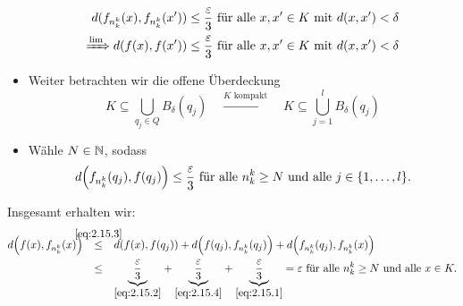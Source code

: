 \begin{beweis}
\begin{itemize}
		\begin{align}
			d(f_{n_k^k}(x),f_{n_k^k}(x')) &\leq \frac{\varepsilon}{3} \text{ für alle } x,x' \in K \text{ mit } d(x,x') < \delta \label{eq:2.15.1} \\
			\xRightarrow{\lim} d(f(x),f(x')) &\leq \frac{\varepsilon}{3} \text{ für alle } x,x' \in K \text{ mit } d(x,x') < \delta \label{eq:2.15.2}
		\end{align}
		\item Weiter betrachten wir die offene Überdeckung
		\begin{equation}
			K \subseteq \bigcup_{q_j \in Q} B_\delta (q_j) \quad \xrightarrow{K \text{ kompakt}} \quad K \subseteq \bigcup_{j=1}^l B_\delta (q_j) \label{eq:2.15.3}
		\end{equation}
		\item Wähle $N \in \mathbb{N}$, sodass
		\begin{equation}
			d\enbrace*{f_{n_k^k}(q_j),f(q_j)} \leq \frac{\varepsilon}{3} \text{ für alle } n_k^k \geq N \text{ und alle } j \in \{1, \dots, l\}. \label{eq:2.15.4}
		\end{equation}
	\end{itemize}
	\newpage
	Insgesamt erhalten wir:
	\begin{align*}
		d\enbrace*{f(x),f_{n_k^k}(x)} &\stack{\eqref{eq:2.15.3}}{\leq} d(f(x),f(q_j)) + d\enbrace*{f(q_j),f_{n_k^k}(q_j)} + d\enbrace*{f_{n_k^k}(q_j),f_{n_k^k}(x)} \\
		&\stack{}{\leq} \Underbrace{\frac{\varepsilon}{3}}{\eqref{eq:2.15.2}} + \Underbrace{\frac{\varepsilon}{3}}{\eqref{eq:2.15.4}} + \Underbrace{\frac{\varepsilon}{3}}{\eqref{eq:2.15.1}} = \varepsilon \text{ für alle } n_k^k \geq N \text{ und alle } x \in K.
	\end{align*}
\end{beweis}

